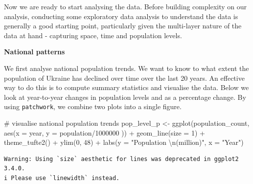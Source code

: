 \documentclass[
  letterpaper,
  DIV=11,
  numbers=noendperiod]{scrreprt}
\newenvironment{Shaded}{\begin{snugshade}}{\end{snugshade}}
\newcommand{\AttributeTok}[1]{\textcolor[rgb]{0.40,0.45,0.13}{#1}}
\newcommand{\CommentTok}[1]{\textcolor[rgb]{0.37,0.37,0.37}{#1}}
\newcommand{\DecValTok}[1]{\textcolor[rgb]{0.68,0.00,0.00}{#1}}
\newcommand{\FunctionTok}[1]{\textcolor[rgb]{0.28,0.35,0.67}{#1}}
\newcommand{\NormalTok}[1]{\textcolor[rgb]{0.00,0.23,0.31}{#1}}
\newcommand{\OtherTok}[1]{\textcolor[rgb]{0.00,0.23,0.31}{#1}}
\newcommand{\SpecialCharTok}[1]{\textcolor[rgb]{0.37,0.37,0.37}{#1}}
\newcommand{\StringTok}[1]{\textcolor[rgb]{0.13,0.47,0.30}{#1}}
\begin{document}
Now we are ready to start analysing the data. Before building complexity
on our analysis, conducting some exploratory data analysis to understand
the data is generally a good starting point, particularly given the
multi-layer nature of the data at hand - capturing space, time and
population levels.

\textbf{National patterns}

We first analyse national population trends. We want to know to what
extent the population of Ukraine has declined over time over the last 20
years. An effective way to do this is to compute summary statistics and
visualise the data. Below we look at year-to-year changes in population
levels and as a percentage change. By using \texttt{patchwork}, we
combine two plots into a single figure.

\begin{Shaded}
\begin{Highlighting}[]
\CommentTok{\# visualise national population trends}
\NormalTok{pop\_level\_p }\OtherTok{\textless{}{-}} \FunctionTok{ggplot}\NormalTok{(population\_count, }
       \FunctionTok{aes}\NormalTok{(}\AttributeTok{x =}\NormalTok{ year, }\AttributeTok{y =}\NormalTok{ population}\SpecialCharTok{/}\DecValTok{1000000}\NormalTok{ )) }\SpecialCharTok{+}
  \FunctionTok{geom\_line}\NormalTok{(}\AttributeTok{size =} \DecValTok{1}\NormalTok{) }\SpecialCharTok{+}
  \FunctionTok{theme\_tufte2}\NormalTok{() }\SpecialCharTok{+}
  \FunctionTok{ylim}\NormalTok{(}\DecValTok{0}\NormalTok{, }\DecValTok{48}\NormalTok{) }\SpecialCharTok{+} 
  \FunctionTok{labs}\NormalTok{(}\AttributeTok{y =} \StringTok{"Population }\SpecialCharTok{\textbackslash{}n}\StringTok{(million)"}\NormalTok{,}
       \AttributeTok{x =} \StringTok{"Year"}\NormalTok{)}
\end{Highlighting}
\end{Shaded}

\begin{verbatim}
Warning: Using `size` aesthetic for lines was deprecated in ggplot2 3.4.0.
i Please use `linewidth` instead.
\end{verbatim}
\end{document}
